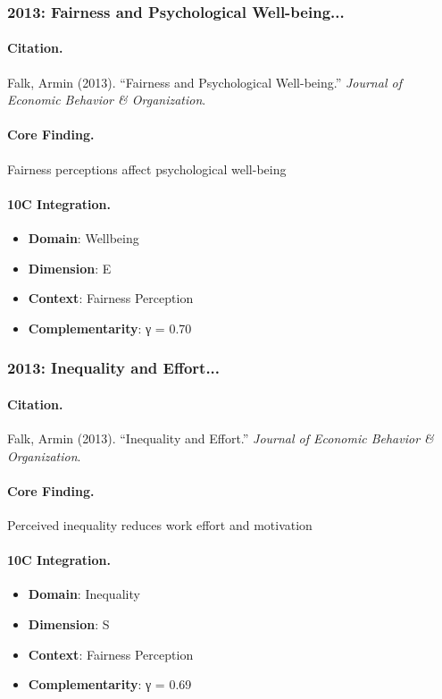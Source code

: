 \subsubsection{2013: Fairness and Psychological Well-being...}

\paragraph{Citation.}
Falk, Armin (2013). ``Fairness and Psychological Well-being.''
\textit{Journal of Economic Behavior & Organization}.

\paragraph{Core Finding.}
Fairness perceptions affect psychological well-being

\paragraph{10C Integration.}
\begin{itemize}[nosep]
  \item \textbf{Domain}: Wellbeing
  \item \textbf{Dimension}: E
  \item \textbf{Context}: Fairness Perception
  \item \textbf{Complementarity}: γ = 0.70
\end{itemize}


\subsubsection{2013: Inequality and Effort...}

\paragraph{Citation.}
Falk, Armin (2013). ``Inequality and Effort.''
\textit{Journal of Economic Behavior & Organization}.

\paragraph{Core Finding.}
Perceived inequality reduces work effort and motivation

\paragraph{10C Integration.}
\begin{itemize}[nosep]
  \item \textbf{Domain}: Inequality
  \item \textbf{Dimension}: S
  \item \textbf{Context}: Fairness Perception
  \item \textbf{Complementarity}: γ = 0.69
\end{itemize}


